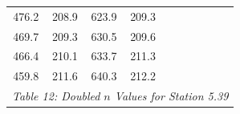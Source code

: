 \begin{center}
\begin{tabular}{|cccc||cccc||cc|}
    476.2    & 208.9                   & 623.9 & 209.3                        &       &                           &       &                              &          &                                    \\
    469.7    & 209.3                   & 630.5 & 209.6                        &       &                           &       &                              &          &                                    \\
    466.4    & 210.1                   & 633.7 & 211.3                        &       &                           &       &                              &          &                                    \\
    459.8    & 211.6                   & 640.3 & 212.2                        &       &                           &       &                              &          &                                    \\
    \hline\multicolumn{10}{c}{\emph{Table 12: Doubled $n$ Values for Station 5.39}}
\end{tabular}



\end{center}
